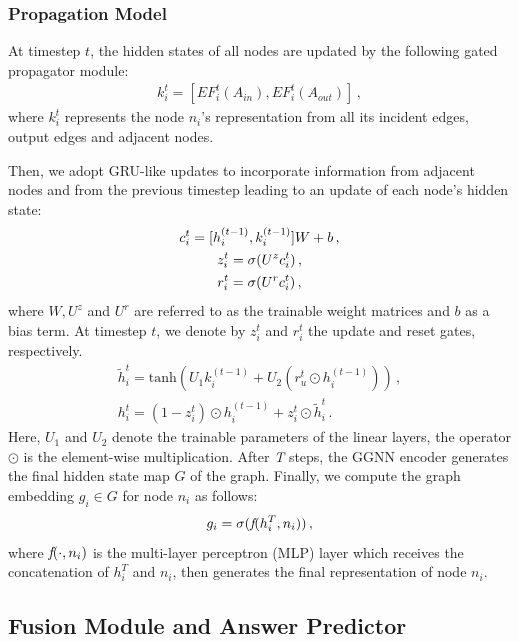 \documentclass[letterpaper]{article} %
\begin{document}
\medskip
\subsubsection{Propagation Model}

At timestep $t$, the hidden states of all nodes are updated by the following gated propagator module:
\begin{gather}
    k_{i}^t = [EF_i^t(A_{in}), EF_i^t(A_{out})] \, ,
\end{gather}
where $k_{i}^t$ represents the node ${n}_i$'s representation from all its incident edges, output edges and adjacent nodes.

Then, we adopt GRU-like updates to incorporate information from adjacent nodes and from the previous timestep leading to an update of each node's hidden state:
\begin{gather}\notag
    c_i^t = [h_i^{(t-1)}, k_{i}^{(t-1)}] W + b \, ,\\
    z_i^t = \sigma(U^z c_i^t) \, , \\\notag
    r_i^t = \sigma(U^r c_i^t)\, , \notag
\end{gather}
where $W, U^z$ and $U^r$ are referred to as the trainable weight matrices and $b$ as a bias term.
At timestep $t$, we denote by $z_i^t$ and $r_i^t$ the update and reset gates, respectively.
\begin{gather}
    \tilde{h}_i^t = \text{tanh}(U_1 k_{i}^{(t-1)} + U_2(r_u^t \odot h_i^{(t-1)})) \, ,\\
    h_i^t = (1-z_i^t)\odot h_i^{(t-1)} + z_i^t\odot \tilde{h}_i^t \, .
\end{gather}
Here, $U_1$ and $U_2$ denote the trainable parameters of the linear layers, the operator $\odot$ is the element-wise multiplication.
After \emph{T} steps, the GGNN encoder generates the final hidden state map $G$ of the graph. 
Finally, we compute the graph embedding $g_i \in G$ for node ${n}_i$ as follows:
\begin{equation}
    g_i = \sigma( \emph{f}(h_i^T, n_i)) \, ,
\end{equation}
where $\emph{f}(\cdot, n_i)$ is the multi-layer perceptron (MLP) layer which receives the concatenation of $h_i^T$ and $n_i$, then generates the final representation of node ${n}_i$. 

\subsection{Fusion Module and Answer Predictor}
\end{document}
